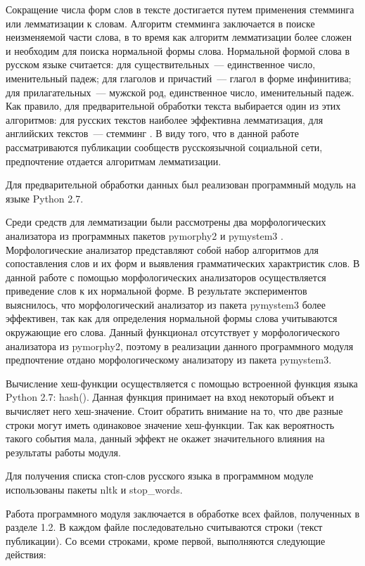 \documentclass[a4paper]{report}
\begin{document}
	
	Сокращение числа форм слов в тексте достигается путем применения стемминга или лемматизации к словам. Алгоритм стемминга заключается в поиске неизменяемой части слова, в то время как алгоритм лемматизации более сложен и необходим для поиска нормальной формы слова. Нормальной формой слова в русском языке считается: для существительных~--- единственное число, именительный падеж; для глаголов и причастий~--- глагол в форме инфинитива; для прилагательных~--- мужской род, единственное число, именительный падеж. Как правило, для предварительной обработки текста выбирается один из этих алгоритмов: для русских текстов наиболее эффективна лемматизация, для английских текстов~--- стемминг \cite{bib:Voron1}. В виду того, что в данной работе рассматриваются публикации сообществ русскоязычной социальной сети, предпочтение отдается алгоритмам лемматизации.
	
	 
	
	Для предварительной обработки данных был реализован программный модуль на языке Python 2.7.
	
	Среди средств для лемматизации были рассмотрены два морфологических анализатора из программных пакетов pymorphy2 \cite{bib:pymorphy2} и pymystem3 \cite{bib:pymystem3}. Морфологические анализатор представляют собой набор алгоритмов для сопоставления слов и их форм и выявления грамматических характристик слов. В данной работе с помощью морфологических анализаторов осуществляется приведение слов к их нормальной форме. В результате экспериментов выяснилось, что морфологический анализатор из пакета pymystem3 более эффективен, так как для определения нормальной формы слова учитываются окружающие его слова. Данный функционал отсутствует у морфологического анализатора из pymorphy2, поэтому в реализации данного программного модуля предпочтение отдано морфологическому анализатору из пакета pymystem3.
	
	Вычисление хеш-функции осуществляется с помощью встроенной функция языка Python 2.7: hash(). Данная функция принимает на вход некоторый объект и вычисляет него хеш-значение. Стоит обратить внимание на то, что две разные строки могут иметь одинаковое значение хеш-функции. Так как вероятность такого события мала, данный эффект не окажет значительного влияния на результаты работы модуля.
	
	Для получения списка стоп-слов русского языка в программном модуле использованы пакеты nltk и stop\_words.
	
	Работа программного модуля заключается в обработке всех файлов, полученных в разделе 1.2. В каждом файле последовательно считываются строки (текст публикации). Со всеми строками, кроме первой, выполняются следующие действия:
	
\end{document}
